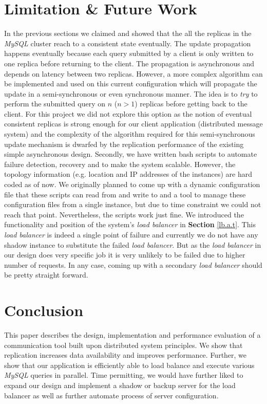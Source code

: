 \documentclass[12pt]{article}
\begin{document}
\section{Limitation \& Future Work}
In the previous sections we claimed and showed that the all the replicas in the
\emph{MySQL} cluster reach to a consistent state eventually. The update
propagation happens eventually because each query submitted by a client is only
written to one replica before returning to the client. The propagation is
asynchronous and depends on latency between two replicas. However, a more
complex algorithm can be implemented and used on this current configuration
which will propagate the update in a semi-synchronous or even synchronous
manner. The idea is to \emph{try} to perform the submitted query on $n$ ($n >
1$) replicas before getting back to the client. For this project we did not
explore this option as the notion of eventual consistent replicas is strong
enough for our client application (distributed message system) and the
complexity of the algorithm required for this semi-synchronous update mechanism
is dwarfed by the replication performance of the existing simple asynchronous
design. Secondly, we have written bash scripts to automate failure detection,
recovery and to make the system scalable. However, the topology information
(e.g. location and IP addresses of the instances) are hard coded as of now. We
originally planned to come up with a dynamic configuration file that these
scripts can read from and write to and a tool to manage these configuration
files from a single instance, but due to time constraint we could not reach that
point. Nevertheless, the scripts work just fine. We introduced the functionality
and position of the system\rq{}s \emph{load balancer} in \textbf{Section }
\ref{lb.a.t}. This \emph{load balancer} is indeed a single point of failure and
currently we do not have any shadow instance to substitute the failed \emph{load
balancer}. But as the \emph{load balancer} in our design does very specific job
it is very unlikely to be failed due to higher number of requests. In any case,
coming up with a secondary \emph{load balancer} should be pretty straight
forward. 

\section{Conclusion}
This paper describes the design, implementation and performance evaluation of a
communication tool built upon distributed system principles. We show that
replication increases data availability and improves performance. Further, we
show that our application is efficiently able to load balance and execute
various \emph{MySQL} queries in parallel. Time permitting, we would have further liked
to expand our design and implement a shadow or backup server for the load
balancer as well as further automate process of server configuration.
\end{document}

